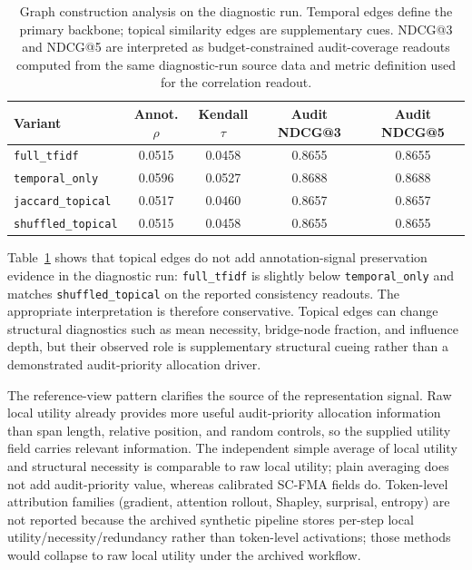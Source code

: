 \documentclass[a4paper,fleqn]{cas-sc}
\begin{document}
\begin{table}[ht]
\caption{Graph construction analysis on the diagnostic run. Temporal edges define the primary backbone; topical similarity edges are supplementary cues. NDCG@3 and NDCG@5 are interpreted as budget-constrained audit-coverage readouts computed from the same diagnostic-run source data and metric definition used for the correlation readout.}
\label{tab:graph-construction-analysis}
\centering
\small
\renewcommand{\arraystretch}{1.08}
\begin{tabular}{lcccc}
\toprule
\textbf{Variant} & \textbf{Annot. $\rho$} & \textbf{Kendall $\tau$} & \textbf{Audit NDCG@3} & \textbf{Audit NDCG@5} \\
\midrule
\texttt{full\_tfidf} & 0.0515 & 0.0458 & 0.8655 & 0.8655 \\
\texttt{temporal\_only} & 0.0596 & 0.0527 & 0.8688 & 0.8688 \\
\texttt{jaccard\_topical} & 0.0517 & 0.0460 & 0.8657 & 0.8657 \\
\texttt{shuffled\_topical} & 0.0515 & 0.0458 & 0.8655 & 0.8655 \\
\bottomrule
\end{tabular}
\end{table}

Table~\ref{tab:graph-construction-analysis} shows that topical edges do not add annotation-signal preservation evidence in the diagnostic run: \texttt{full\_tfidf} is slightly below \texttt{temporal\_only} and matches \texttt{shuffled\_topical} on the reported consistency readouts. The appropriate interpretation is therefore conservative. Topical edges can change structural diagnostics such as mean necessity, bridge-node fraction, and influence depth, but their observed role is supplementary structural cueing rather than a demonstrated audit-priority allocation driver.

The reference-view pattern clarifies the source of the representation signal. Raw local utility already provides more useful audit-priority allocation information than span length, relative position, and random controls, so the supplied utility field carries relevant information. The independent simple average of local utility and structural necessity is comparable to raw local utility; plain averaging does not add audit-priority value, whereas calibrated SC-FMA fields do. Token-level attribution families (gradient, attention rollout, Shapley, surprisal, entropy) are not reported because the archived synthetic pipeline stores per-step local utility/necessity/redundancy rather than token-level activations; those methods would collapse to raw local utility under the archived workflow.
\end{document}
